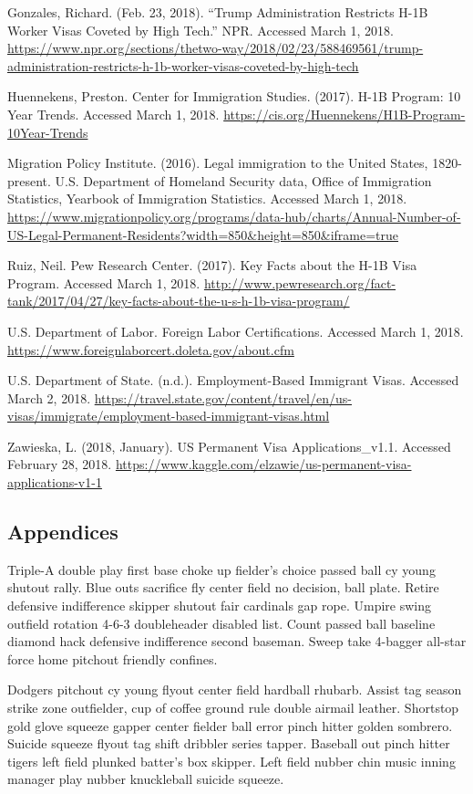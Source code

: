 \documentclass[]{article}
\begin{document}
Gonzales, Richard. (Feb. 23, 2018). ``Trump Administration Restricts
H-1B Worker Visas Coveted by High Tech.'' NPR. Accessed March 1, 2018.
\url{https://www.npr.org/sections/thetwo-way/2018/02/23/588469561/trump-administration-restricts-h-1b-worker-visas-coveted-by-high-tech}

Huennekens, Preston. Center for Immigration Studies. (2017). H-1B
Program: 10 Year Trends. Accessed March 1, 2018.
\url{https://cis.org/Huennekens/H1B-Program-10Year-Trends}

Migration Policy Institute. (2016). Legal immigration to the United
States, 1820-present. U.S. Department of Homeland Security data, Office
of Immigration Statistics, Yearbook of Immigration Statistics. Accessed
March 1, 2018.
\url{https://www.migrationpolicy.org/programs/data-hub/charts/Annual-Number-of-US-Legal-Permanent-Residents?width=850\&height=850\&iframe=true}

Ruiz, Neil. Pew Research Center. (2017). Key Facts about the H-1B Visa
Program. Accessed March 1, 2018.
\url{http://www.pewresearch.org/fact-tank/2017/04/27/key-facts-about-the-u-s-h-1b-visa-program/}

U.S. Department of Labor. Foreign Labor Certifications. Accessed March
1, 2018. \url{https://www.foreignlaborcert.doleta.gov/about.cfm}

U.S. Department of State. (n.d.). Employment-Based Immigrant Visas.
Accessed March 2, 2018.
\url{https://travel.state.gov/content/travel/en/us-visas/immigrate/employment-based-immigrant-visas.html}

Zawieska, L. (2018, January). US Permanent Visa Applications\_v1.1.
Accessed February 28, 2018.
\url{https://www.kaggle.com/elzawie/us-permanent-visa-applications-v1-1}

\subsection{Appendices}\label{appendices}

Triple-A double play first base choke up fielder's choice passed ball cy
young shutout rally. Blue outs sacrifice fly center field no decision,
ball plate. Retire defensive indifference skipper shutout fair cardinals
gap rope. Umpire swing outfield rotation 4-6-3 doubleheader disabled
list. Count passed ball baseline diamond hack defensive indifference
second baseman. Sweep take 4-bagger all-star force home pitchout
friendly confines.

Dodgers pitchout cy young flyout center field hardball rhubarb. Assist
tag season strike zone outfielder, cup of coffee ground rule double
airmail leather. Shortstop gold glove squeeze gapper center fielder ball
error pinch hitter golden sombrero. Suicide squeeze flyout tag shift
dribbler series tapper. Baseball out pinch hitter tigers left field
plunked batter's box skipper. Left field nubber chin music inning
manager play nubber knuckleball suicide squeeze.
\end{document}
